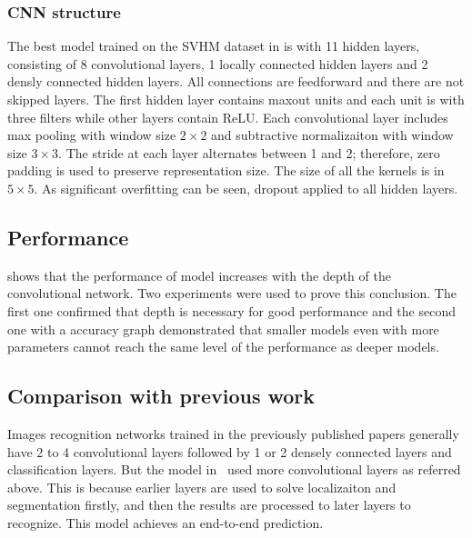 \documentclass[conference]{IEEEtran}
\begin{document}
\subsubsection{CNN structure}
The best model trained on the SVHM dataset in \cite{street} is with 11 hidden layers, consisting of 8 convolutional layers, 1 locally connected hidden layers and 2 densly connected hidden layers. All connections are feedforward and there are not skipped layers. The first hidden layer contains maxout units\cite{maxout} and each unit is with three filters while other layers contain ReLU. Each convolutional layer includes max pooling with window size $2\times2$ and subtractive normalizaiton with window size $3\times3$.
The stride at each layer alternates between 1 and 2; therefore, zero padding is used to preserve representation size. The size of all the kernels is in $5\times5$. As significant overfitting can be seen, dropout applied to all hidden layers.
\subsection{Performance}
\cite{street} shows that the performance of model increases with the depth of the convolutional network. Two experiments were used to prove this conclusion. The first one confirmed that depth is necessary for good performance and the second one with a accuracy graph demonstrated that smaller models even with more parameters cannot reach the same level of the performance as deeper models.

\subsection{Comparison with previous work}
Images recognition networks trained in the previously published papers generally have 2 to 4 convolutional layers followed by 1 or 2 densely connected layers and classification layers. But the model in~\cite{street} used more convolutional layers as referred above. This is because earlier layers are used to solve localizaiton and segmentation firstly, and then the results are processed to later layers to recognize. This model achieves an end-to-end prediction.
\end{document}
